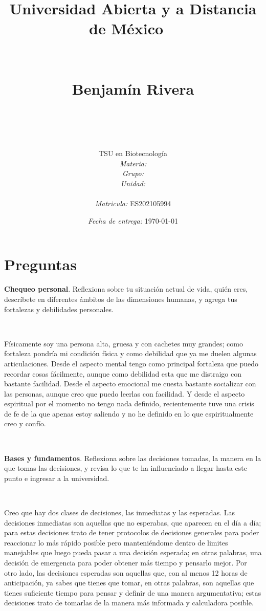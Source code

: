 \documentclass[12pt]{article}
\title{
	{\Huge Universidad Abierta y a Distancia de M\'exico}
	\ \\\ \\\ \\ {\Large Benjam\'in Rivera} \\
	\bf{\titulo}\\\ \\}
\author{
	TSU en Biotecnolog\'ia \\
	\textit{Materia:} \materia \\
	\textit{Grupo:} \grupo \\
	\textit{Unidad:} \unidad \\
	\\
	\textit{Matricula:} ES202105994 }
\date{\textit{Fecha de entrega:} \today}
\begin{document}
\maketitle\newpage

\section*{Preguntas}

\noindent \textbf{Chequeo personal}. Reflexiona sobre tu situación actual de vida, quién eres, descríbete en diferentes ámbitos de las dimensiones humanas, y agrega tus fortalezas y debilidades personales.
\par \
	\par Físicamente soy una persona alta, gruesa y con cachetes muy grandes; como fortaleza pondría mi condición física y como debilidad que ya me duelen algunas articulaciones. Desde el aspecto mental tengo como principal fortaleza que puedo recordar cosas fácilmente, aunque como debilidad esta que me distraigo con bastante facilidad. Desde el aspecto emocional me cuesta bastante socializar con las personas, aunque creo que puedo leerlas con facilidad. Y desde el aspecto espiritual por el momento no tengo nada definido, recientemente tuve una crisis de fe de la que apenas estoy saliendo y no he definido en lo que espiritualmente creo y confío.


\par \ \\
\par 
\noindent \textbf{Bases y fundamentos}. Reflexiona sobre las decisiones tomadas, la manera en la que tomas las decisiones, y revisa lo que te ha influenciado a llegar hasta este punto e ingresar a la universidad.
\par \
	\par Creo que hay dos clases de decisiones, las inmediatas y las esperadas. Las decisiones inmediatas son aquellas que no esperabas, que aparecen en el día a día; para estas decisiones trato de tener protocolos de decisiones generales para poder reaccionar lo más rápido posible pero manteniéndome dentro de limites manejables que luego pueda pasar a una decisión esperada; en otras palabras, una decisión de emergencia para poder obtener más tiempo y pensarlo mejor. Por otro lado, las decisiones esperadas son aquellas que, con al menos 12 horas de anticipación, ya sabes que tienes que tomar, en otras palabras, son aquellas que tienes suficiente tiempo para pensar y definir de una manera argumentativa; estas decisiones trato de tomarlas de la manera más informada y calculadora posible.
\end{document}
